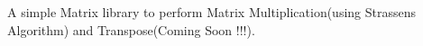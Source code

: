 A simple Matrix library to perform Matrix Multiplication(using Strassen\textquotesingle{}s Algorithm) and Transpose(Coming Soon !!!). 